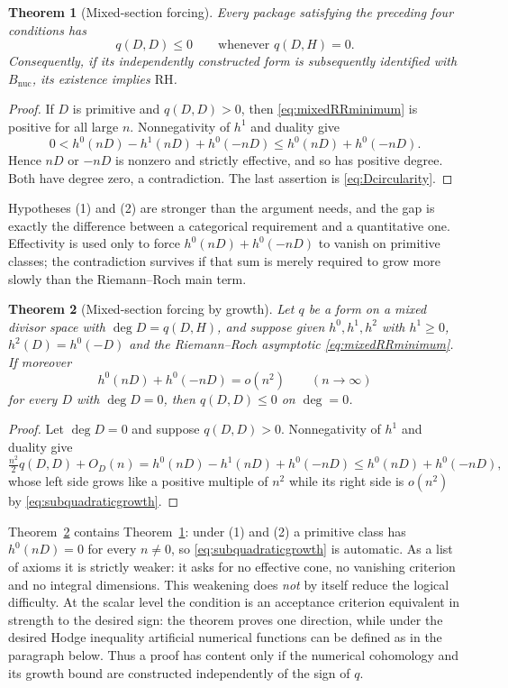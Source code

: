 \documentclass[11pt]{amsart}
\newtheorem{theorem}{Theorem}[section]
\theoremstyle{definition}
\theoremstyle{remark}
\newcommand{\RH}{\mathrm{RH}}
\begin{document}
\begin{theorem}[Mixed-section forcing]
\label{thm:mixedsectionforcing}
Every package satisfying the preceding four conditions has
\[
 q(D,D)\le0\qquad\text{whenever }q(D,H)=0.
\]
Consequently, if its independently constructed form is subsequently
identified with $B_{\mathrm{nuc}}$, its existence implies $\RH$.
\end{theorem}

\begin{proof}
If $D$ is primitive and $q(D,D)>0$, then
\eqref{eq:mixedRRminimum} is positive for all large $n$.  Nonnegativity of
$h^1$ and duality give
\[
 0<h^0(nD)-h^1(nD)+h^0(-nD)
 \le h^0(nD)+h^0(-nD).
\]
Hence $nD$ or $-nD$ is nonzero and strictly effective, and so has positive
degree.  Both have degree zero, a contradiction.  The last assertion is
\eqref{eq:Dcircularity}.
\end{proof}

Hypotheses (1) and (2) are stronger than the argument needs, and the gap is
exactly the difference between a categorical requirement and a quantitative
one.  Effectivity is used only to force $h^0(nD)+h^0(-nD)$ to vanish on
primitive classes; the contradiction survives if that sum is merely required
to grow more slowly than the Riemann--Roch main term.

\begin{theorem}[Mixed-section forcing by growth]
\label{thm:growthforcing}
Let $q$ be a form on a mixed divisor space with $\deg D=q(D,H)$, and suppose
given $h^0,h^1,h^2$ with $h^1\ge0$, $h^2(D)=h^0(-D)$ and the Riemann--Roch
asymptotic \eqref{eq:mixedRRminimum}.  If moreover
\begin{equation}\label{eq:subquadraticgrowth}
 h^0(nD)+h^0(-nD)=o(n^2)\qquad(n\to\infty)
\end{equation}
for every $D$ with $\deg D=0$, then $q(D,D)\le0$ on $\deg=0$.
\end{theorem}

\begin{proof}
Let $\deg D=0$ and suppose $q(D,D)>0$.  Nonnegativity of $h^1$ and duality
give
\[
 \tfrac{n^2}{2}q(D,D)+O_D(n)
 =h^0(nD)-h^1(nD)+h^0(-nD)
 \le h^0(nD)+h^0(-nD),
\]
whose left side grows like a positive multiple of $n^2$ while its right side
is $o(n^2)$ by \eqref{eq:subquadraticgrowth}.
\end{proof}

Theorem~\ref{thm:growthforcing} contains
Theorem~\ref{thm:mixedsectionforcing}: under (1) and (2) a primitive class
has $h^0(nD)=0$ for every $n\ne0$, so \eqref{eq:subquadraticgrowth} is
automatic.  As a list of axioms it is strictly weaker: it asks for no
effective cone, no vanishing criterion and no integral dimensions.  This
weakening does \emph{not} by itself reduce the logical difficulty.  At the
scalar level the condition is an acceptance criterion equivalent in strength
to the desired sign: the theorem proves one direction, while under the
desired Hodge inequality artificial numerical functions can be defined as in
the paragraph below.  Thus a proof has content only if the numerical
cohomology and its growth bound are constructed independently of the sign of
$q$.
\end{document}
